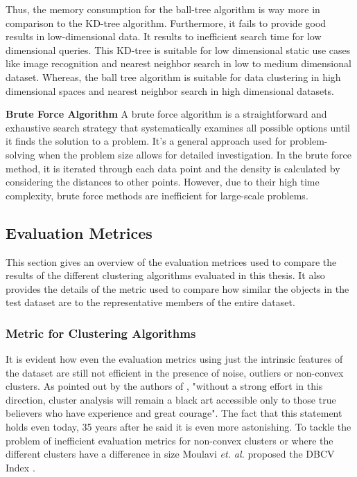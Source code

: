 Thus, the memory consumption for the ball-tree algorithm is way more in comparison to the \ac{KD}-tree algorithm. Furthermore, it fails to provide good results in low-dimensional data. It results to inefficient search time for low dimensional queries. This \ac{KD}-tree is suitable for low dimensional static use cases like image recognition and nearest neighbor search in low to medium dimensional dataset. Whereas, the ball tree algorithm is suitable for data clustering in high dimensional spaces and nearest neighbor search in high dimensional datasets.

\vspace{5mm}

\textbf{Brute Force Algorithm}
A brute force algorithm is a straightforward and exhaustive search strategy that systematically examines all possible options until it finds the solution to a problem. It’s a general approach used for problem-solving when the problem size allows for detailed investigation. In the brute force method, it is iterated through each data point and the density is calculated by considering the distances to other points. However, due to their high time complexity, brute force methods are inefficient for large-scale problems.

\subsection{Evaluation Metrices}
This section gives an overview of the evaluation metrices used to compare the results of the different clustering algorithms evaluated in this thesis. It also provides the details of the metric used to compare how similar the objects in the test dataset are to the representative members of the entire dataset. 
\subsubsection{Metric for Clustering Algorithms}
It is evident how even the evaluation metrics using just the intrinsic features of the dataset are still not efficient in the presence of noise, outliers or non-convex clusters. As pointed out by the authors of \cite{jain1988algorithms}, "without a strong effort in this direction, cluster analysis will remain a black art accessible only to those true believers who have experience and great courage". The fact that this statement holds even today, 35 years after he said it is even more astonishing. To tackle the problem of inefficient evaluation metrics for non-convex clusters or where the different clusters have a difference in size Moulavi \textit{et. al.} proposed the \ac{DBCV} Index \cite{moulavi2014density}.

